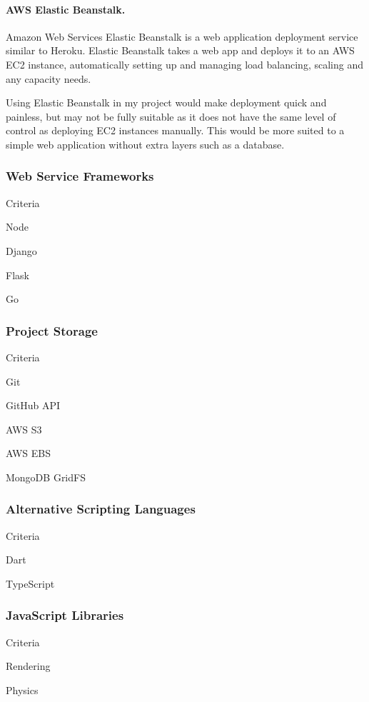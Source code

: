 \documentclass[a4paper, 12pt]{article}
\begin{document}
\paragraph{AWS Elastic Beanstalk.}
Amazon Web Services Elastic Beanstalk is a web application deployment service similar to Heroku. Elastic Beanstalk takes a web app and deploys it to an AWS EC2 instance, automatically setting up and managing load balancing, scaling and any capacity needs.


Using Elastic Beanstalk in my project would make deployment quick and painless, but may not be fully suitable as it does not have the same level of control as deploying EC2 instances manually. This would be more suited to a simple web application without extra layers such as a database.


\subsubsection{Web Service Frameworks}
Criteria


Node

Django

Flask

Go


\subsubsection{Project Storage}
Criteria


Git


GitHub API


AWS S3


AWS EBS


MongoDB GridFS


\subsubsection{Alternative Scripting Languages}
Criteria


Dart


TypeScript


\subsubsection{JavaScript Libraries}
Criteria


Rendering


Physics
\end{document}
